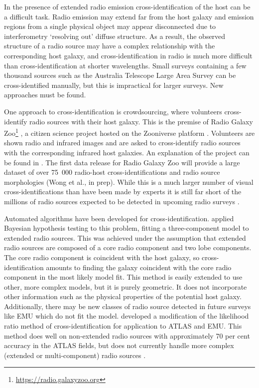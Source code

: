 \documentclass[fleqn,usenatbib,usedcolumn]{mnras}
\newcommand{\edited}[1]{#1}
\begin{document}
  In the presence of extended radio emission cross-identification of the host can be a
  difficult task. \edited{Radio emission may extend far from the host galaxy
  and emission regions from a single physical object may appear disconnected
  due to interferometry `resolving out' diffuse structure. As a result, the
  observed structure of a radio source may have a complex relationship
  with the corresponding host galaxy, and cross-identification in radio is
  much more difficult than cross-identification at shorter wavelengths.} Small surveys
  containing a few thousand sources such as the Australia Telescope Large Area Survey
  \citep[ATLAS;][]{norris06, middelberg08} can be cross-identified manually,
  but this is impractical for larger surveys. New approaches must be found.

  One approach to cross-identification is crowdsourcing, where volunteers
  cross-identify radio sources with their host galaxy. This is the premise of Radio Galaxy
  Zoo\footnote{\url{https://radio.galaxyzoo.org}} \citep{banfield15}, a
  citizen science project hosted on the Zooniverse platform \citep{lintott08}.
  Volunteers are shown radio and infrared images and are asked to
  cross-identify radio sources with the corresponding infrared host galaxies. An
  explanation of the project can be found in \citet{banfield15}. The first
  data release for Radio Galaxy Zoo will provide a large dataset of over
  75~000 radio-host cross-identifications and radio source morphologies
  (Wong et al., in prep). While this is a much larger number of visual
  cross-identifications than have been made by experts \citep[e.g.,
  ][]{Taylor2007,Gendre2008,Grant2010,norris06,middelberg08} it is still far
  short of the millions of radio sources expected to be detected in upcoming
  radio surveys \citep{norris17surveys}.

  Automated algorithms have been developed for cross-identification.
  \citet{fan15} applied Bayesian
  hypothesis testing to this problem, fitting a three-component model to extended radio
  sources. This was achieved under the assumption that extended radio sources
  are composed of a core radio component and two lobe components. The core
  radio component is coincident with the host galaxy, so cross-identification
  amounts to finding the galaxy coincident with the core radio component in
  the most likely model fit. This method is easily extended to use other, more
  complex models, but it is purely geometric. It does not incorporate
  other information such as the physical properties of the potential host
  galaxy. Additionally, there may be new classes of radio source detected in
  future surveys like EMU which do not fit the model. \citet{weston18lrpy}
  developed a modification of the likelihood ratio method of
  cross-identification \citep{richter75likelihood} for application to ATLAS
  and EMU. This method does well on non-extended radio sources
  with approximately 70 per cent accuracy in the ATLAS fields, but does
  not currently handle more complex (extended or multi-component) radio sources
  \citep{norris17unexpected}.
\end{document}
